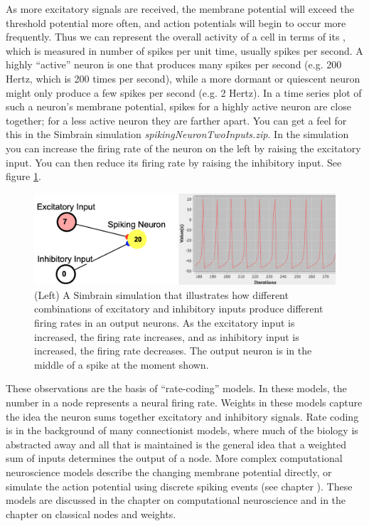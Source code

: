 As more excitatory signals are received, the membrane potential will exceed the threshold potential more often, and action potentials will begin to occur more frequently. Thus we can represent the overall activity of a cell in terms of its , which is measured in number of spikes per unit time, usually spikes per second. A highly ``active'' neuron is one that produces many spikes per second (e.g. 200 Hertz, which is 200 times per second), while a more dormant or quiescent neuron might only produce a few spikes per second (e.g. 2 Hertz). In a time series plot of such a neuron's membrane potential, spikes for a highly active neuron are close together; for a less active neuron they are farther apart. You can get a feel for this in the Simbrain simulation  \emph{spikingNeuronTwoInputs.zip}. In the simulation you can increase the firing rate of the neuron on the left by raising the excitatory input. You can then reduce its firing rate by raising the inhibitory input. See figure \ref{twoNeuronsSpiking}.
  
 \begin{figure}[h]
\centering
\includegraphics[scale=.4]{./images/TwoNeuronsSpiking.png}
\caption[Jeff Yoshimi.]{(Left) A Simbrain simulation that illustrates how different combinations of excitatory and inhibitory inputs produce different firing rates in an output neurons. As the excitatory input is increased, the firing rate increases, and as inhibitory input is increased, the firing rate decreases. The output neuron is in the middle of a spike at the moment shown. }
\label{twoNeuronsSpiking}
\end{figure}

These observations are the basis of ``rate-coding'' models. In these models, the number in a node represents a neural firing rate. Weights in these models capture the idea the neuron sums together excitatory and inhibitory signals. Rate coding is in the background of many connectionist models, where much of the biology is abstracted away and all that is maintained is the general idea that a weighted sum of inputs determines the output of a node.  More complex computational neuroscience models describe the changing membrane potential directly, or simulate the action potential using discrete spiking events (see chapter ). These models are discussed in the chapter on computational neuroscience and in the chapter on classical nodes and weights.

